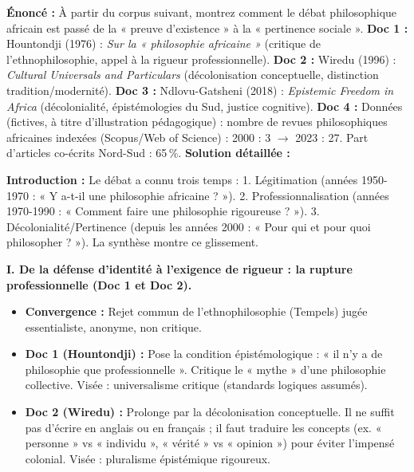 \documentclass[11pt]{article}
\newcommand{\cle}[1]{{\popxbold\color{popdark}#1}}
\begin{document}
\begin{exoresolu}
\textbf{Énoncé :} À partir du corpus suivant, montrez comment le débat philosophique africain est passé de la « preuve d'existence » à la « pertinence sociale ».
\textbf{Doc 1 :} Hountondji (1976) : \emph{Sur la « philosophie africaine »} (critique de l'ethnophilosophie, appel à la rigueur professionnelle).
\textbf{Doc 2 :} Wiredu (1996) : \emph{Cultural Universals and Particulars} (décolonisation conceptuelle, distinction tradition/modernité).
\textbf{Doc 3 :} Ndlovu-Gatsheni (2018) : \emph{Epistemic Freedom in Africa} (décolonialité, épistémologies du Sud, justice cognitive).
\textbf{Doc 4 :} Données (fictives, à titre d'illustration pédagogique) : nombre de revues philosophiques africaines indexées (Scopus/Web of Science) : 2000 : 3 $\rightarrow$ 2023 : 27. Part d'articles co-écrits Nord-Sud : 65\,\%.
\tcblower
\textbf{Solution détaillée :}

\textbf{Introduction :} Le débat a connu trois temps : 1. \cle{Légitimation} (années 1950-1970 : « Y a-t-il une philosophie africaine ? »). 2. \cle{Professionnalisation} (années 1970-1990 : « Comment faire une philosophie rigoureuse ? »). 3. \cle{Décolonialité/Pertinence} (depuis les années 2000 : « Pour qui et pour quoi philosopher ? »). La synthèse montre ce glissement.

\textbf{I. De la défense d'identité à l'exigence de rigueur : la rupture professionnelle (Doc 1 et Doc 2).}
\begin{itemize}
    \item \textbf{Convergence :} Rejet commun de l'\cle{ethnophilosophie} (Tempels) jugée essentialiste, anonyme, non critique.
    \item \textbf{Doc 1 (Hountondji) :} Pose la condition \cle{épistémologique} : « il n'y a de philosophie que professionnelle ». Critique le « mythe » d'une philosophie collective. Visée : \cle{universalisme critique} (standards logiques assumés).
    \item \textbf{Doc 2 (Wiredu) :} Prolonge par la \cle{décolonisation conceptuelle}. Il ne suffit pas d'écrire en anglais ou en français ; il faut \cle{traduire} les concepts (ex. « personne » vs « individu », « vérité » vs « opinion ») pour éviter l'impensé colonial. Visée : \cle{pluralisme épistémique} rigoureux.
\end{itemize}


\end{exoresolu}
\end{document}

